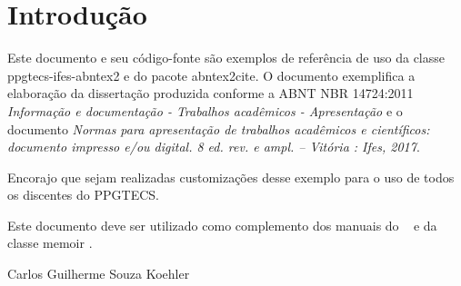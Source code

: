 \chapter{Introdução}
\setlength\afterchapskip{\lineskip}

Este documento e seu código-fonte são exemplos de referência de uso da classe
\textsf{ppgtecs-ifes-abntex2} e do pacote \textsf{abntex2cite}. O documento exemplifica a elaboração da dissertação produzida conforme a ABNT NBR 14724:2011 \emph{Informação e documentação - Trabalhos acadêmicos - Apresentação} e o documento \emph{Normas para apresentação de trabalhos acadêmicos e científicos: documento impresso e/ou digital. 8 ed. rev. e ampl. – Vitória : Ifes, 2017}.

Encorajo que sejam realizadas customizações desse exemplo para o uso de todos os discentes do PPGTECS. 

Este documento deve ser utilizado como complemento dos manuais do \abnTeX\ 
\cite{abntex2classe,abntex2cite,abntex2cite-alf} e da classe \textsf{memoir}
\cite{memoir}. 

Carlos Guilherme Souza Koehler